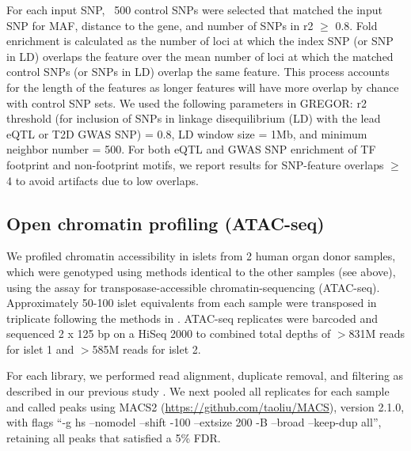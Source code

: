For each input SNP, ~500 control SNPs were selected that matched the input SNP for MAF, distance to the gene, and number of SNPs in r2 $\geq$ 0.8. Fold enrichment is calculated as the number of loci at which the index SNP (or SNP in LD) overlaps the feature over the mean number of loci at which the matched control SNPs (or SNPs in LD) overlap the same feature. This process accounts for the length of the features as longer features will have more overlap by chance with control SNP sets. We used the following parameters in GREGOR: r2 threshold (for inclusion of SNPs in linkage disequilibrium (LD) with the lead eQTL or T2D GWAS SNP) = 0.8, LD window size = 1Mb, and minimum neighbor number = 500. For both eQTL and GWAS SNP enrichment of TF footprint and non-footprint motifs, we report results for SNP-feature overlaps $\geq$ 4 to avoid artifacts due to low overlaps.

\subsection{Open chromatin profiling (ATAC-seq)}
We profiled chromatin accessibility in islets from 2 human organ donor samples, which were genotyped using methods identical to the other samples (see above), using the assay for transposase-accessible chromatin-sequencing (ATAC-seq).  Approximately 50-100 islet equivalents from each sample were transposed in triplicate following the methods in \cite{buenrostroTranspositionNativeChromatin2013}.  ATAC-seq replicates were barcoded and sequenced 2 x 125 bp on a HiSeq 2000 to combined total depths of $>$831M reads for islet 1 and $>$585M reads for islet 2.

For each library, we performed read alignment, duplicate removal, and filtering as described in our previous study \cite{scottGeneticRegulatorySignature2016}. We next pooled all replicates for each sample and called peaks using MACS2 (\url{https://github.com/taoliu/MACS}), version 2.1.0, with flags “-g hs --nomodel --shift -100 --extsize 200 -B --broad --keep-dup all”, retaining all peaks that satisfied a 5\% FDR.

